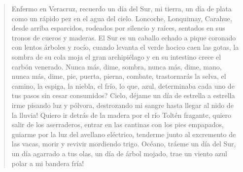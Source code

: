 \documentclass[12pt]{article}
\begin{document}
\clearpage
{}
\begin{verse}
Enfermo en Veracruz, recuerdo un día  
del Sur, mi tierra, un día de plata  
como un rápido pez en el agua del cielo.  
Loncoche, Lonquimay, Carahue, desde arriba  
esparcidos, rodeados por silencio y raíces,  
sentados en sus tronos de cueros y maderas.  
El Sur es un caballo echado a pique  
coronado con lentos árboles y rocío,  
cuando levanta el verde hocico caen las gotas,  
la sombra de su cola moja el gran archipiélago  
y en su intestino crece el carbón venerado.  
Nunca más, dime, sombra, nunca más, dime, mano,  
nunca más, dime, pie, puerta, pierna, combate,  
trastornarás la selva, el camino, la espiga,  
la niebla, el frío, lo que, azul, determinaba  
cada uno de tus pasos sin cesar consumidos?  
Cielo, déjame un día de estrella a estrella irme  
pisando luz y pólvora, destrozando mi sangre  
hasta llegar al nido de la lluvia!  
	 Quiero ir  
detrás de la madera por el río  
Toltén fragante, quiero salir de los aserraderos,  
entrar en las cantinas con los pies empapados,  
guiarme por la luz del avellano eléctrico,  
tenderme junto al excremento de las vacas,  
morir y revivir mordiendo trigo.  
	 Océano, tráeme  
un día del Sur, un día agarrado a tus olas,  
un día de árbol mojado, trae un viento  
azul polar a mi bandera fría!  

\end{verse}
\end{document}
